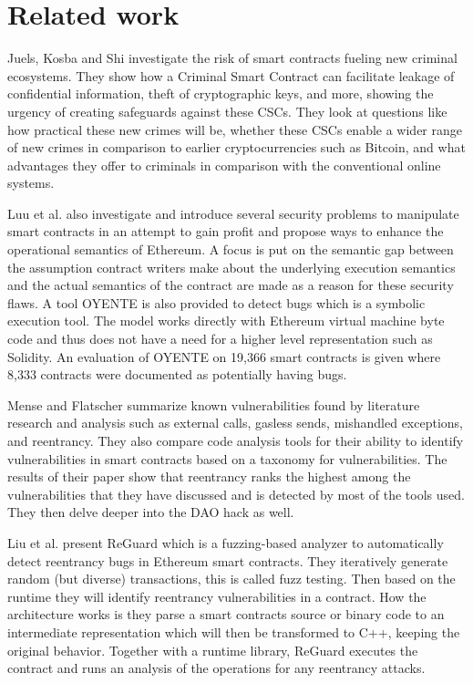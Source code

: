 \documentclass[10pt,conference]{IEEEtran}
\begin{document}
\section{Related work}


Juels, Kosba and Shi\cite{criminal} investigate the risk of smart contracts fueling new criminal ecosystems. They show how a Criminal Smart Contract can facilitate leakage of confidential information, theft of cryptographic keys, and more, showing the urgency of creating safeguards against these CSCs. They look at questions like how practical these new crimes will be, whether these CSCs enable a wider range of new crimes in comparison to earlier cryptocurrencies such as Bitcoin, and what advantages they offer to criminals in comparison with the conventional online systems.


Luu et al.  \cite{smarter} also investigate and introduce several security problems to manipulate smart contracts in an attempt to gain profit and propose ways to enhance the operational semantics of Ethereum. A focus is put on the semantic gap between the assumption contract writers make about the underlying execution semantics and the actual semantics of the contract are made as a reason for these security flaws. A tool OYENTE is also provided to detect bugs which is a symbolic execution tool. The model works directly with Ethereum virtual machine byte code and thus does not have a need for a higher level representation such as Solidity. An evaluation of OYENTE on 19,366 smart contracts is given where 8,333 contracts were documented as potentially having bugs.

Mense and Flatscher \cite{security} summarize known vulnerabilities found by literature research and analysis such as external calls, gasless sends, mishandled exceptions, and reentrancy. They also compare code analysis tools for their ability to identify vulnerabilities in smart contracts based on a taxonomy for vulnerabilities. The results of their paper show that reentrancy ranks the highest among the vulnerabilities that they have discussed and is detected by most of the tools used. They then delve deeper into the DAO hack as well.


Liu et al. \cite{reguard} present ReGuard which is a fuzzing-based analyzer to automatically detect reentrancy bugs in Ethereum smart contracts. They iteratively generate random (but diverse) transactions, this is called fuzz testing. Then based on the runtime they will identify reentrancy vulnerabilities in a contract. How the architecture works is they parse a smart contracts source or binary code to an intermediate representation which will then be transformed to C++, keeping the original behavior. Together with a runtime library, ReGuard executes the contract and runs an analysis of the operations for any reentrancy attacks.
\end{document}
